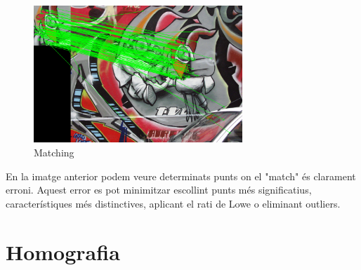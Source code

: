 	\begin{figure}[H]
		\centering
		\includegraphics[width=0.7\textwidth]{images/matching}
		\caption{Matching}
	\end{figure}
\noindent
	En la imatge anterior podem veure determinats punts on el "match" és clarament erroni. Aquest error es pot minimitzar escollint punts més significatius, característiques més distinctives, aplicant el rati
	de Lowe o eliminant outliers.

\newpage
\section{Homografia}

